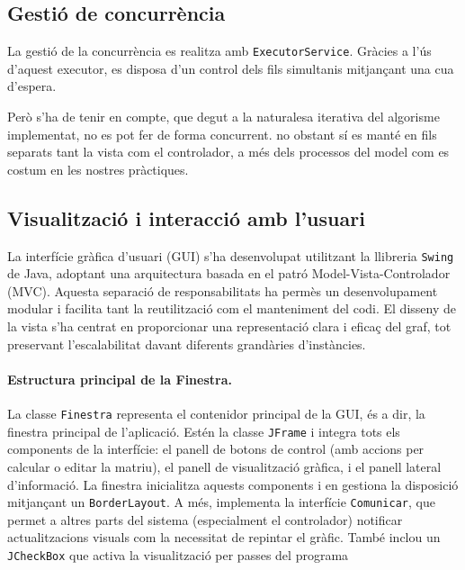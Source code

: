 \documentclass{ieeetj}
\begin{document}
\medskip
\noindent

\subsection{Gestió de concurrència}
La gestió de la concurrència es realitza amb \texttt{ExecutorService}. Gràcies a l’ús d’aquest executor, es disposa d’un control dels fils simultanis mitjançant una cua d’espera.

Però s'ha de tenir en compte, que degut a la naturalesa iterativa del algorisme implementat, no es pot fer de forma concurrent. no obstant sí es manté en fils separats tant la vista com el controlador, a més dels processos del model com es costum en les nostres pràctiques.

\subsection{Visualització i interacció amb l'usuari}

La interfície gràfica d’usuari (GUI) s’ha desenvolupat utilitzant la llibreria \texttt{Swing} de Java, adoptant una arquitectura basada en el patró Model-Vista-Controlador (MVC)\cite{mvcPattern}. Aquesta separació de responsabilitats ha permès un desenvolupament modular i facilita tant la reutilització com el manteniment del codi. El disseny de la vista s’ha centrat en proporcionar una representació clara i eficaç del graf, tot preservant l’escalabilitat davant diferents grandàries d’instàncies.

\paragraph{Estructura principal de la Finestra.}
La classe \texttt{Finestra} representa el contenidor principal de la GUI, és a dir, la finestra principal de l’aplicació. Estén la classe \texttt{JFrame} i integra tots els components de la interfície: el panell de botons de control (amb accions per calcular o editar la matriu), el panell de visualització gràfica, i el panell lateral d’informació. La finestra inicialitza aquests components i en gestiona la disposició mitjançant un \texttt{BorderLayout}. A més, implementa la interfície \texttt{Comunicar}, que permet a altres parts del sistema (especialment el controlador) notificar actualitzacions visuals com la necessitat de repintar el gràfic. També inclou un \texttt{JCheckBox} que activa la visualització per passes del programa\newline
\end{document}
